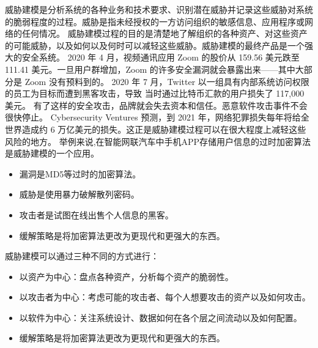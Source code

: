 威胁建模是分析系统的各种业务和技术要求、识别潜在威胁并记录这些威胁对系统的脆弱程度的过程。威胁是指未经授权的一方访问组织的敏感信息、应用程序或网络的任何情况。 
威胁建模过程的目的是清楚地了解组织的各种资产、对这些资产的可能威胁，以及如何以及何时可以减轻这些威胁。威胁建模的最终产品是一个强大的安全系统。 
2020 年 4 月，视频通讯应用 Zoom 的股价从 159.56 美元跌至 111.41 美元。一旦用户群增加，Zoom 的许多安全漏洞就会暴露出来——其中大部分是 Zoom 没有预料到的。
2020 年 7 月，Twitter 以一组具有内部系统访问权限的员工为目标而遭到黑客攻击，导致 当时通过比特币汇款的用户损失了 117,000 美元。 
有了这样的安全攻击，品牌就会失去资本和信任。恶意软件攻击事件不会很快停止。
Cyber​​security Ventures 预测\cite{apache1}，到 2021 年，网络犯罪损失每年将给全世界造成约 6 万亿美元的损失。这正是威胁建模过程可以在很大程度上减轻这些风险的地方。 
\newline
举例来说,在智能网联汽车中手机APP存储用户信息的过时加密算法是威胁建模的一个应用。
\begin{itemize}
    \item 漏洞是MD5等过时的加密算法。
    \item 威胁是使用暴力破解散列密码。
    \item 攻击者是试图在线出售个人信息的黑客。
    \item 缓解策略是将加密算法更改为更现代和更强大的东西。
  \end{itemize}
威胁建模可以通过三种不同的方式进行：
\begin{itemize}
  \item 以资产为中心：盘点各种资产，分析每个资产的脆弱性。
  \item 以攻击者为中心：考虑可能的攻击者、每个人想要攻击的资产以及如何攻击。
  \item 以软件为中心：关注系统设计、数据如何在各个层之间流动以及如何配置。
  \item 缓解策略是将加密算法更改为更现代和更强大的东西。
\end{itemize} 
